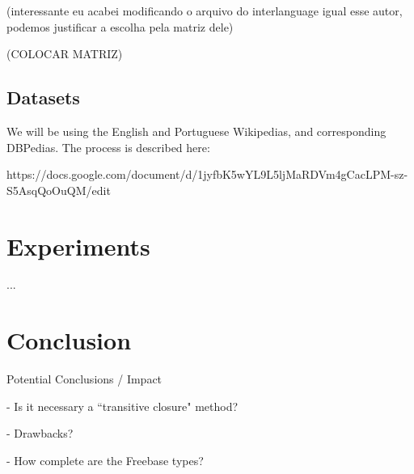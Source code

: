 \documentclass[10pt,a4paper]{llncs}
\begin{document}
(interessante eu acabei modificando o arquivo do interlanguage igual esse autor, podemos justificar a escolha pela matriz dele)

(COLOCAR MATRIZ)

\subsection{Datasets}

We will be using the English and Portuguese Wikipedias, and corresponding DBPedias. The process is described here: 

https://docs.google.com/document/d/1jyfbK5wYL9L5ljMaRDVm4gCacLPM-sz-S5AsqQoOuQM/edit


\section{Experiments}

...


\section{Conclusion}

Potential Conclusions / Impact

- Is it necessary a ``transitive closure" method?

- Drawbacks?

- How complete are the Freebase types?




\end{document}
